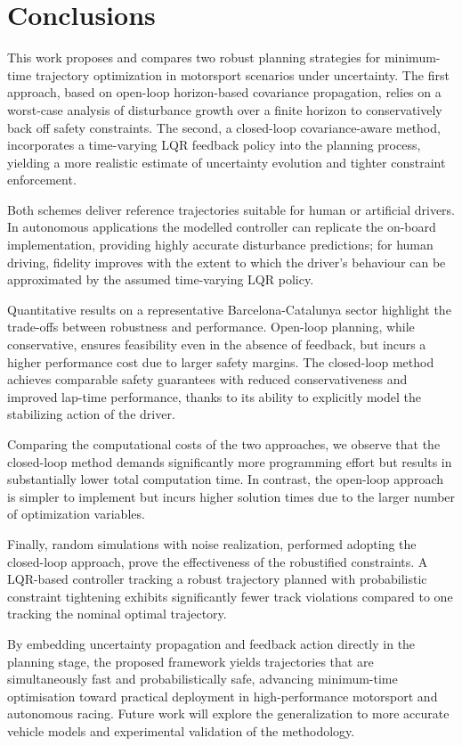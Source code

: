 \section{Conclusions}
\label{sec:conclusions}

This work proposes and compares two robust planning strategies for minimum-time trajectory optimization in motorsport scenarios under uncertainty. The first approach, based on open-loop horizon-based covariance propagation, relies on a worst-case analysis of disturbance growth over a finite horizon to conservatively back off safety constraints. The second, a closed-loop covariance-aware method, incorporates a time-varying LQR feedback policy into the planning process, yielding a more realistic estimate of uncertainty evolution and tighter constraint enforcement.

Both schemes deliver reference trajectories suitable for human or artificial drivers. In autonomous applications the modelled controller can replicate the on-board implementation, providing highly accurate disturbance predictions; for human driving, fidelity improves with the extent to which the driver's behaviour can be approximated by the assumed time-varying LQR policy.

Quantitative results on a representative Barcelona-Catalunya sector highlight the trade-offs between robustness and performance. Open-loop planning, while conservative, ensures feasibility even in the absence of feedback, but incurs a higher performance cost due to larger safety margins. The closed-loop method achieves comparable safety guarantees with reduced conservativeness and improved lap-time performance, thanks to its ability to explicitly model the stabilizing action of the driver.

Comparing the computational costs of the two approaches, we observe that the closed-loop method demands significantly more programming effort but results in substantially lower total computation time. In contrast, the open-loop approach is simpler to implement but incurs higher solution times due to the larger number of optimization variables.

Finally, random simulations with noise realization, performed adopting the closed-loop approach, prove the effectiveness of the robustified constraints. A LQR-based controller tracking a robust trajectory planned with probabilistic constraint tightening exhibits significantly fewer track violations compared to one tracking the nominal optimal trajectory.

By embedding uncertainty propagation and feedback action directly in the planning stage, the proposed framework yields trajectories that are simultaneously fast and probabilistically safe, advancing minimum-time optimisation toward practical deployment in high-performance motorsport and autonomous racing. Future work will explore the generalization to more accurate vehicle models and experimental validation of the methodology. 
